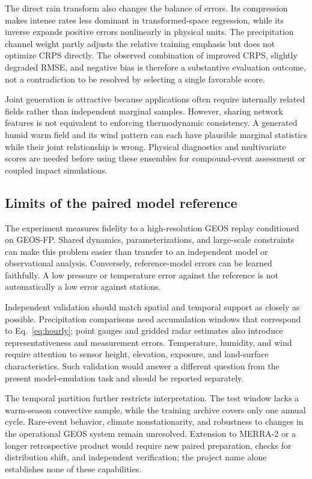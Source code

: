 \documentclass[10pt]{article}
\begin{document}
The direct rain transform also changes the balance of errors. Its compression makes intense rates less dominant in transformed-space regression, while its inverse expands positive errors nonlinearly in physical units. The precipitation channel weight partly adjusts the relative training emphasis but does not optimize CRPS directly. The observed combination of improved CRPS, slightly degraded RMSE, and negative bias is therefore a substantive evaluation outcome, not a contradiction to be resolved by selecting a single favorable score.

Joint generation is attractive because applications often require internally related fields rather than independent marginal samples. However, sharing network features is not equivalent to enforcing thermodynamic consistency. A generated humid warm field and its wind pattern can each have plausible marginal statistics while their joint relationship is wrong. Physical diagnostics and multivariate scores are needed before using these ensembles for compound-event assessment or coupled impact simulations.

\subsection{Limits of the paired model reference}
The experiment measures fidelity to a high-resolution GEOS replay conditioned on GEOS-FP. Shared dynamics, parameterizations, and large-scale constraints can make this problem easier than transfer to an independent model or observational analysis. Conversely, reference-model errors can be learned faithfully. A low pressure or temperature error against the reference is not automatically a low error against stations.

Independent validation should match spatial and temporal support as closely as possible. Precipitation comparisons need accumulation windows that correspond to Eq.~\eqref{eq:hourly}; point gauges and gridded radar estimates also introduce representativeness and measurement errors. Temperature, humidity, and wind require attention to sensor height, elevation, exposure, and land-surface characteristics. Such validation would answer a different question from the present model-emulation task and should be reported separately.

The temporal partition further restricts interpretation. The test window lacks a warm-season convective sample, while the training archive covers only one annual cycle. Rare-event behavior, climate nonstationarity, and robustness to changes in the operational GEOS system remain unresolved. Extension to MERRA-2 or a longer retrospective product would require new paired preparation, checks for distribution shift, and independent verification; the project name alone establishes none of these capabilities.
\end{document}
